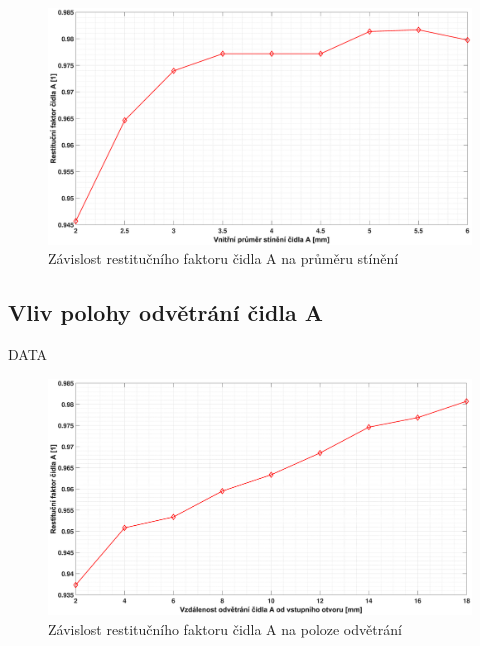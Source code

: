         \begin{figure}[ht!]
            \centering
            \includegraphics*[width=\textwidth, trim={5.25cm 1.0cm 5.8cm 2.0cm}]{400_SIMULACE_KONSTRUKCNICH_UPRAV/Grafy/05_prumer_stineni_A}
            \caption{Závislost restitučního faktoru čidla A na průměru stínění}
            \label{fig:prumer-stineni-A}
        \end{figure}
    
   \newpage
     \subsection{Vliv polohy odvětrání čidla A}
        DATA
        
          \begin{figure}[ht!]
            \centering
            \includegraphics*[width=\textwidth, trim={5.25cm 1.0cm 5.8cm 2.0cm}]{400_SIMULACE_KONSTRUKCNICH_UPRAV/Grafy/06_poloha_odvetrani_A.eps}
            \caption{Závislost restitučního faktoru čidla A na poloze odvětrání}
            \label{fig:poloha-odvetrani-A}
        \end{figure}
    
